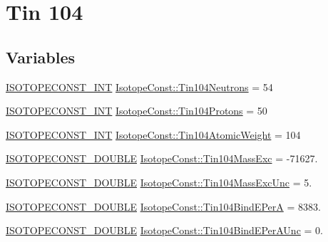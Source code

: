 \hypertarget{group___isotope_const-_tin-_sn104}{}\section{Tin 104}
\label{group___isotope_const-_tin-_sn104}
\subsection*{Variables}
\begin{DoxyCompactItemize}
\item 
\mbox{\hyperlink{group___isotope_const-_macros_ga5f18360b3e99483a35c32d789e62621c}{I\+S\+O\+T\+O\+P\+E\+C\+O\+N\+S\+T\+\_\+\+I\+NT}} \mbox{\hyperlink{group___isotope_const-_tin-_sn104_ga59b6bc04ed570437dbda0ff73ca72cf9}{Isotope\+Const\+::\+Tin104\+Neutrons}} = 54
\item 
\mbox{\hyperlink{group___isotope_const-_macros_ga5f18360b3e99483a35c32d789e62621c}{I\+S\+O\+T\+O\+P\+E\+C\+O\+N\+S\+T\+\_\+\+I\+NT}} \mbox{\hyperlink{group___isotope_const-_tin-_sn104_ga226a0c4e0b056efefdf8312f8af9c92c}{Isotope\+Const\+::\+Tin104\+Protons}} = 50
\item 
\mbox{\hyperlink{group___isotope_const-_macros_ga5f18360b3e99483a35c32d789e62621c}{I\+S\+O\+T\+O\+P\+E\+C\+O\+N\+S\+T\+\_\+\+I\+NT}} \mbox{\hyperlink{group___isotope_const-_tin-_sn104_ga1fed39e65506b3ec7b9484cc77fa6014}{Isotope\+Const\+::\+Tin104\+Atomic\+Weight}} = 104
\item 
\mbox{\hyperlink{group___isotope_const-_macros_ga8f45a7272ce02c0b4c65c44636ed719a}{I\+S\+O\+T\+O\+P\+E\+C\+O\+N\+S\+T\+\_\+\+D\+O\+U\+B\+LE}} \mbox{\hyperlink{group___isotope_const-_tin-_sn104_ga2b7e2cf8f8063367a2756f05c83efe4c}{Isotope\+Const\+::\+Tin104\+Mass\+Exc}} = -\/71627.
\item 
\mbox{\hyperlink{group___isotope_const-_macros_ga8f45a7272ce02c0b4c65c44636ed719a}{I\+S\+O\+T\+O\+P\+E\+C\+O\+N\+S\+T\+\_\+\+D\+O\+U\+B\+LE}} \mbox{\hyperlink{group___isotope_const-_tin-_sn104_ga7de611f189ee1de30e805ab8b7cb0e11}{Isotope\+Const\+::\+Tin104\+Mass\+Exc\+Unc}} = 5.
\item 
\mbox{\hyperlink{group___isotope_const-_macros_ga8f45a7272ce02c0b4c65c44636ed719a}{I\+S\+O\+T\+O\+P\+E\+C\+O\+N\+S\+T\+\_\+\+D\+O\+U\+B\+LE}} \mbox{\hyperlink{group___isotope_const-_tin-_sn104_ga1870ba6153b46f61dc9bacf66ab38e27}{Isotope\+Const\+::\+Tin104\+Bind\+E\+PerA}} = 8383.
\item 
\mbox{\hyperlink{group___isotope_const-_macros_ga8f45a7272ce02c0b4c65c44636ed719a}{I\+S\+O\+T\+O\+P\+E\+C\+O\+N\+S\+T\+\_\+\+D\+O\+U\+B\+LE}} \mbox{\hyperlink{group___isotope_const-_tin-_sn104_ga77510a18823b17a58a1559fd4b41a153}{Isotope\+Const\+::\+Tin104\+Bind\+E\+Per\+A\+Unc}} = 0.

\end{DoxyCompactItemize}
